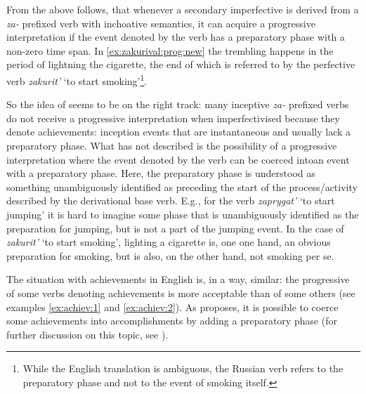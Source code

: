From the above follows, that whenever a secondary imperfective  is derived from a \textit{za-}   prefixed verb with inchoative  semantics, it can acquire a progressive interpretation  if the event denoted by the verb has a preparatory phase with a non-zero time span. In \ref{ex:zakurival:prog:new} the trembling happens in the period of lightning the cigarette, the end of which is referred to by the perfective verb  \textit{zakurit'} `to start smoking'\footnote{While the English translation is ambiguous, the Russian verb refers to the preparatory phase and not to the event of smoking itself.}. 

So the idea of \citet{Braginsky:08} seems to be on the right track: many inceptive  \textit{za-}  prefixed verbs do not receive a progressive interpretation  when imperfectivised because they denote achievements: inception events that are instantaneous and usually lack a preparatory phase. What \citet{Braginsky:08} has not described is the possibility of a progressive interpretation  where the event denoted by the verb can be coerced intoan event with a preparatory phase. Here, the preparatory phase is understood as something unambiguously identified as preceding the start of the process/activity described by the derivational base verb. E.g., for the verb \textit{zaprygat'} `to start jumping' it is hard to imagine some phase that is unambiguously identified as the preparation for jumping, but is not a part of the jumping event. In the case of \textit{zakurit'} `to start smoking', lighting a cigarette is, one one hand, an obvious preparation for smoking, but is also, on the other hand, not smoking per se. 

The situation with achievements in English is, in a way, similar: the progressive of some verbs denoting achievements is more acceptable than of some others (see examples \ref{ex:achiev:1} and \ref{ex:achiev:2}). As \citet{Rothstein:04} proposes, it is possible to coerce some achievements into accomplishments by adding a preparatory phase (for further discussion on this topic, see \citealt{Gyarmathy:15}).

